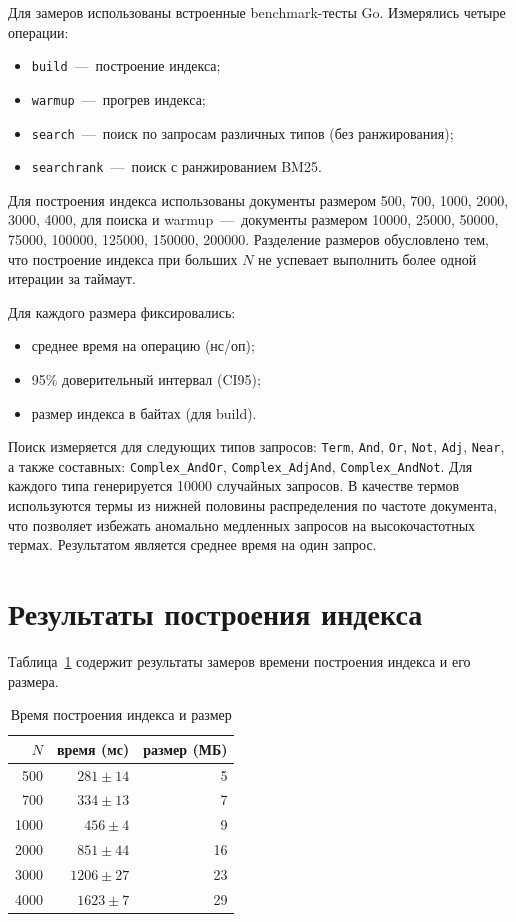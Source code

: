 \documentclass{itmo}
\begin{document}
Для замеров использованы встроенные benchmark-тесты Go.
Измерялись четыре операции:
\begin{itemize}
	\item \texttt{build}~---~построение индекса;
	\item \texttt{warmup}~---~прогрев индекса;
	\item \texttt{search}~---~поиск по запросам различных типов (без ранжирования);
	\item \texttt{searchrank}~---~поиск с ранжированием BM25.
\end{itemize}

Для построения индекса использованы документы размером 500, 700, 1000, 2000, 3000, 4000, для поиска и warmup~---~документы размером 10000, 25000, 50000, 75000, 100000, 125000, 150000, 200000.
Разделение размеров обусловлено тем, что построение индекса при больших $N$ не успевает выполнить более одной итерации за таймаут.

Для каждого размера фиксировались:
\begin{itemize}
	\item среднее время на операцию (нс/оп);
	\item 95\% доверительный интервал (CI95);
	\item размер индекса в байтах (для build).
\end{itemize}

Поиск измеряется для следующих типов запросов: \texttt{Term}, \texttt{And}, \texttt{Or}, \texttt{Not}, \texttt{Adj}, \texttt{Near}, а также составных: \texttt{Complex\_AndOr}, \texttt{Complex\_AdjAnd}, \texttt{Complex\_AndNot}.
Для каждого типа генерируется 10000 случайных запросов.
В качестве термов используются термы из нижней половины распределения по частоте документа, что позволяет избежать аномально медленных запросов на высокочастотных термах.
Результатом является среднее время на один запрос.

\section{Результаты построения индекса}

Таблица~\ref{tab:build} содержит результаты замеров времени построения индекса и его размера.
\begin{table}[H]
	\centering
	\caption{Время построения индекса и размер}
	\label{tab:build}
	\begin{tabular}{|r|r|r|}
		\toprule
		$N$ & время (мс) & размер (МБ) \\
		\midrule
		500  & $281 \pm 14$  & 5  \\
		700  & $334 \pm 13$  & 7  \\
		1000 & $456 \pm 4$   & 9  \\
		2000 & $851 \pm 44$  & 16 \\
		3000 & $1206 \pm 27$ & 23 \\
		4000 & $1623 \pm 7$  & 29 \\
		\bottomrule
	\end{tabular}
\end{table}
\end{document}
